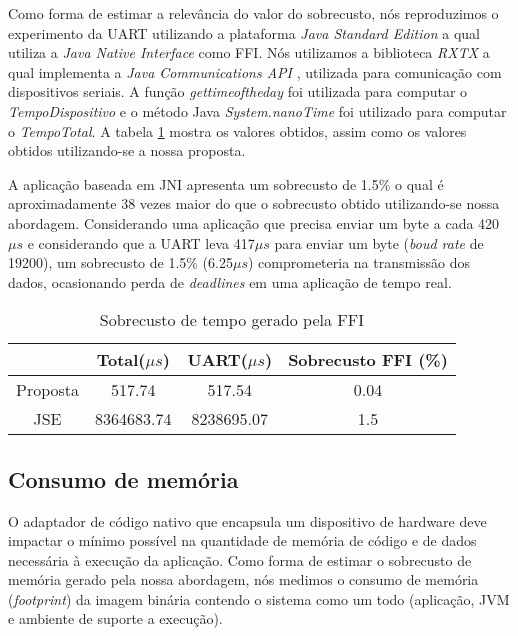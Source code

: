 Como forma de estimar a relevância do valor do sobrecusto, nós reproduzimos o
experimento da UART utilizando a plataforma \emph{Java Standard Edition} a qual
utiliza a \emph{Java Native Interface} como FFI.
Nós utilizamos a biblioteca \emph{RXTX} \cite{site:RXTX} a qual implementa a 
\emph{Java Communications API} \cite{site:JavaCommAPI}, utilizada para 
comunicação com dispositivos seriais.
A função \emph{gettimeoftheday} foi utilizada para computar o 
\emph{TempoDispositivo} e o método Java \emph{System.nanoTime} foi utilizado 
para computar o \emph{TempoTotal}.
A tabela \ref{tab:time_overhead} mostra os valores obtidos, assim como os 
valores obtidos utilizando-se a nossa proposta.

A aplicação baseada em JNI apresenta um sobrecusto de 1.5\% o qual é 
aproximadamente 38 vezes maior do que o sobrecusto obtido utilizando-se nossa
abordagem.
Considerando uma aplicação que precisa enviar um byte a cada 420$\mu s$ e 
considerando que a UART leva 417$\mu s$ para enviar um byte (\emph{boud rate} de 19200),
um sobrecusto de 1.5\% (6.25$\mu s$) comprometeria na transmissão dos dados, 
ocasionando perda de \emph{deadlines} em uma aplicação de tempo real.

\begin{table}[t]
\begin{center}
\begin{tabular}{|c|c|c|c|}
\hline
\textbf{} & \textbf{Total($\mu s$)} & \textbf{UART($\mu s$)} & \textbf{Sobrecusto FFI (\%)}\\
\hline
Proposta & 517.74 & 517.54 & 0.04 \\
\hline
JSE & 8364683.74 & 8238695.07 & 1.5 \\
\hline
\end{tabular}
\caption{Sobrecusto de tempo gerado pela FFI}
\label{tab:time_overhead}
\end{center}
\end{table}

\subsection{Consumo de memória}
O adaptador de código nativo que encapsula um dispositivo de hardware deve
impactar o mínimo possível na quantidade de memória de código e de dados 
necessária à execução da aplicação.
Como forma de estimar o sobrecusto de memória gerado pela nossa abordagem, nós
medimos o consumo de memória (\emph{footprint}) da imagem binária contendo o
sistema como um todo (aplicação, JVM e ambiente de suporte a execução).

